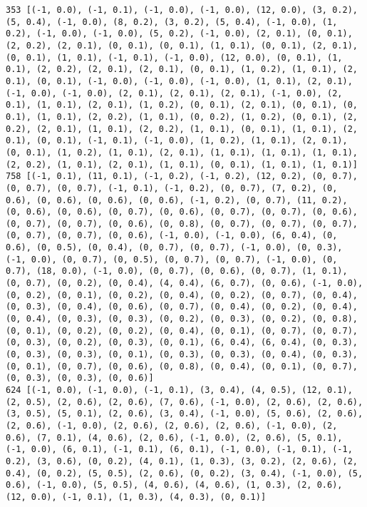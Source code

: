 \documentclass[11pt]{article}
\begin{document}
\begin{Verbatim}[commandchars=\\\{\}]
353 [(-1, 0.0), (-1, 0.1), (-1, 0.0), (-1, 0.0), (12, 0.0), (3, 0.2), (5, 0.4), (-1, 0.0), (8, 0.2), (3, 0.2), (5, 0.4), (-1, 0.0), (1, 0.2), (-1, 0.0), (-1, 0.0), (5, 0.2), (-1, 0.0), (2, 0.1), (0, 0.1), (2, 0.2), (2, 0.1), (0, 0.1), (0, 0.1), (1, 0.1), (0, 0.1), (2, 0.1), (0, 0.1), (1, 0.1), (-1, 0.1), (-1, 0.0), (12, 0.0), (0, 0.1), (1, 0.1), (2, 0.2), (2, 0.1), (2, 0.1), (0, 0.1), (1, 0.2), (1, 0.1), (2, 0.1), (0, 0.1), (-1, 0.0), (-1, 0.0), (-1, 0.0), (1, 0.1), (2, 0.1), (-1, 0.0), (-1, 0.0), (2, 0.1), (2, 0.1), (2, 0.1), (-1, 0.0), (2, 0.1), (1, 0.1), (2, 0.1), (1, 0.2), (0, 0.1), (2, 0.1), (0, 0.1), (0, 0.1), (1, 0.1), (2, 0.2), (1, 0.1), (0, 0.2), (1, 0.2), (0, 0.1), (2, 0.2), (2, 0.1), (1, 0.1), (2, 0.2), (1, 0.1), (0, 0.1), (1, 0.1), (2, 0.1), (0, 0.1), (-1, 0.1), (-1, 0.0), (1, 0.2), (1, 0.1), (2, 0.1), (0, 0.1), (1, 0.2), (1, 0.1), (2, 0.1), (1, 0.1), (1, 0.1), (1, 0.1), (2, 0.2), (1, 0.1), (2, 0.1), (1, 0.1), (0, 0.1), (1, 0.1), (1, 0.1)]
758 [(-1, 0.1), (11, 0.1), (-1, 0.2), (-1, 0.2), (12, 0.2), (0, 0.7), (0, 0.7), (0, 0.7), (-1, 0.1), (-1, 0.2), (0, 0.7), (7, 0.2), (0, 0.6), (0, 0.6), (0, 0.6), (0, 0.6), (-1, 0.2), (0, 0.7), (11, 0.2), (0, 0.6), (0, 0.6), (0, 0.7), (0, 0.6), (0, 0.7), (0, 0.7), (0, 0.6), (0, 0.7), (0, 0.7), (0, 0.6), (0, 0.8), (0, 0.7), (0, 0.7), (0, 0.7), (0, 0.7), (0, 0.7), (0, 0.6), (-1, 0.0), (-1, 0.0), (6, 0.4), (0, 0.6), (0, 0.5), (0, 0.4), (0, 0.7), (0, 0.7), (-1, 0.0), (0, 0.3), (-1, 0.0), (0, 0.7), (0, 0.5), (0, 0.7), (0, 0.7), (-1, 0.0), (0, 0.7), (18, 0.0), (-1, 0.0), (0, 0.7), (0, 0.6), (0, 0.7), (1, 0.1), (0, 0.7), (0, 0.2), (0, 0.4), (4, 0.4), (6, 0.7), (0, 0.6), (-1, 0.0), (0, 0.2), (0, 0.1), (0, 0.2), (0, 0.4), (0, 0.2), (0, 0.7), (0, 0.4), (0, 0.3), (0, 0.4), (0, 0.6), (0, 0.7), (0, 0.4), (0, 0.2), (0, 0.4), (0, 0.4), (0, 0.3), (0, 0.3), (0, 0.2), (0, 0.3), (0, 0.2), (0, 0.8), (0, 0.1), (0, 0.2), (0, 0.2), (0, 0.4), (0, 0.1), (0, 0.7), (0, 0.7), (0, 0.3), (0, 0.2), (0, 0.3), (0, 0.1), (6, 0.4), (6, 0.4), (0, 0.3), (0, 0.3), (0, 0.3), (0, 0.1), (0, 0.3), (0, 0.3), (0, 0.4), (0, 0.3), (0, 0.1), (0, 0.7), (0, 0.6), (0, 0.8), (0, 0.4), (0, 0.1), (0, 0.7), (0, 0.3), (0, 0.3), (0, 0.6)]
624 [(-1, 0.0), (-1, 0.0), (-1, 0.1), (3, 0.4), (4, 0.5), (12, 0.1), (2, 0.5), (2, 0.6), (2, 0.6), (7, 0.6), (-1, 0.0), (2, 0.6), (2, 0.6), (3, 0.5), (5, 0.1), (2, 0.6), (3, 0.4), (-1, 0.0), (5, 0.6), (2, 0.6), (2, 0.6), (-1, 0.0), (2, 0.6), (2, 0.6), (2, 0.6), (-1, 0.0), (2, 0.6), (7, 0.1), (4, 0.6), (2, 0.6), (-1, 0.0), (2, 0.6), (5, 0.1), (-1, 0.0), (6, 0.1), (-1, 0.1), (6, 0.1), (-1, 0.0), (-1, 0.1), (-1, 0.2), (3, 0.6), (0, 0.2), (4, 0.1), (1, 0.3), (3, 0.2), (2, 0.6), (2, 0.4), (0, 0.2), (5, 0.5), (2, 0.6), (0, 0.2), (3, 0.4), (-1, 0.0), (5, 0.6), (-1, 0.0), (5, 0.5), (4, 0.6), (4, 0.6), (1, 0.3), (2, 0.6), (12, 0.0), (-1, 0.1), (1, 0.3), (4, 0.3), (0, 0.1)]

\end{Verbatim}
\end{document}
